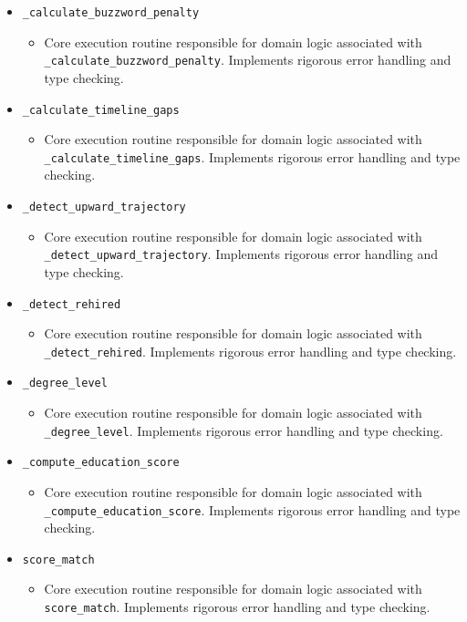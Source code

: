 \documentclass[10pt,journal,compsoc]{IEEEtran}
\begin{document}
\begin{itemize}
    \item \texttt{\_calculate\_buzzword\_penalty}
    \begin{itemize} \item Core execution routine responsible for domain logic associated with \texttt{\_calculate\_buzzword\_penalty}. Implements rigorous error handling and type checking. \end{itemize}
    \item \texttt{\_calculate\_timeline\_gaps}
    \begin{itemize} \item Core execution routine responsible for domain logic associated with \texttt{\_calculate\_timeline\_gaps}. Implements rigorous error handling and type checking. \end{itemize}
    \item \texttt{\_detect\_upward\_trajectory}
    \begin{itemize} \item Core execution routine responsible for domain logic associated with \texttt{\_detect\_upward\_trajectory}. Implements rigorous error handling and type checking. \end{itemize}
    \item \texttt{\_detect\_rehired}
    \begin{itemize} \item Core execution routine responsible for domain logic associated with \texttt{\_detect\_rehired}. Implements rigorous error handling and type checking. \end{itemize}
    \item \texttt{\_degree\_level}
    \begin{itemize} \item Core execution routine responsible for domain logic associated with \texttt{\_degree\_level}. Implements rigorous error handling and type checking. \end{itemize}
    \item \texttt{\_compute\_education\_score}
    \begin{itemize} \item Core execution routine responsible for domain logic associated with \texttt{\_compute\_education\_score}. Implements rigorous error handling and type checking. \end{itemize}
    \item \texttt{score\_match}
    \begin{itemize} \item Core execution routine responsible for domain logic associated with \texttt{score\_match}. Implements rigorous error handling and type checking. \end{itemize}
\end{itemize}
\end{document}
